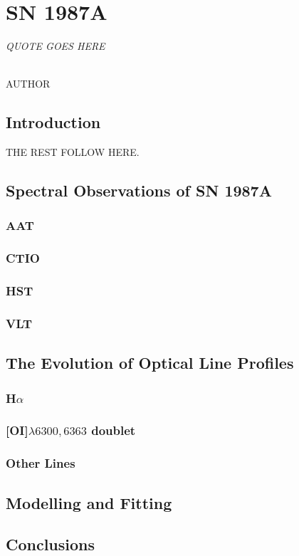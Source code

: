 \chapter{SN 1987A}\label{chp:chp4}

\begin{flushright}
  {\em QUOTE GOES HERE }\\

\ \

\normalsize
{AUTHOR}  
\end{flushright}

\section{Introduction}
THE REST FOLLOW HERE. 

\section{Spectral Observations of SN 1987A}
	\subsection{AAT}
	\subsection{CTIO}
	\subsection{HST}
	\subsection{VLT}
\section{The Evolution of Optical Line Profiles}
	\subsection{H$\alpha$}
	\subsection{[OI]$\lambda 6300,6363$ doublet}
	\subsection{Other Lines}
\section{Modelling and Fitting}
\section{Conclusions}






